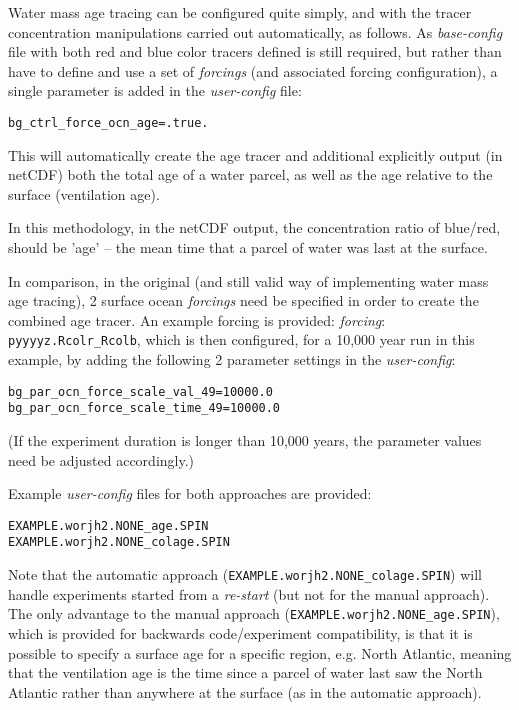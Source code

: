 Water mass age tracing can be configured quite simply, and with the tracer concentration manipulations carried out automatically, as follows. As \textit{base-config} file with both red and blue color tracers defined is still required, but  rather than have to define and use a set of \textit{forcings} (and associated forcing configuration), a single parameter is added in the \textit{user-config} file:
\vspace{-1mm}\small\begin{verbatim}
bg_ctrl_force_ocn_age=.true.
\end{verbatim}\normalsize\vspace{-1mm}
This will automatically create the age tracer and additional explicitly output (in netCDF) both the total age of a water parcel, as well as the age relative to the surface (ventilation age).

In this methodology, in the netCDF output, the concentration ratio of blue/red, should be 'age' -- the mean time that a parcel of water was last at the surface.

In comparison, in the original (and still valid way of implementing water mass age tracing), 2 surface ocean \textit{forcings} need be specified in order to create the combined age tracer. An example forcing is provided: \textit{forcing}: \texttt{pyyyyz.Rcolr\_Rcolb}, which is then configured, for a 10,000 year run in this example, by adding the following 2 parameter settings in the \textit{user-config}:
\vspace{-1mm}\small\begin{verbatim}
bg_par_ocn_force_scale_val_49=10000.0
bg_par_ocn_force_scale_time_49=10000.0
\end{verbatim}\normalsize\vspace{-1mm}

\noindent (If the experiment duration is longer than 10,000 years, the parameter values need be adjusted accordingly.)

\vspace{1mm}
Example \textit{user-config} files for both approaches are provided:
\vspace{-1mm}\small\begin{verbatim}
EXAMPLE.worjh2.NONE_age.SPIN
EXAMPLE.worjh2.NONE_colage.SPIN
\end{verbatim}\normalsize\vspace{-1mm}

\noindent Note that the automatic approach (\texttt{EXAMPLE.worjh2.NONE\_colage.SPIN}) will handle experiments started from a \textit{re-start} (but not for the manual approach). The only advantage to the manual approach (\texttt{EXAMPLE.worjh2.NONE\_age.SPIN}), which is provided for backwards code/experiment compatibility, is that it is possible to specify a surface age for a specific region, e.g. North Atlantic, meaning that the ventilation age is the time since a parcel of water last saw the North Atlantic rather than anywhere at the surface (as in the automatic approach).

